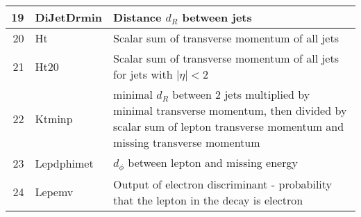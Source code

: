 \begin{table}[hb]
\begin{tabular}{|rl p{}|}
19 & \textsf{DiJetDrmin} &  Distance $d_R$ between jets \\ \hline
20 & \textsf{Ht} &  Scalar sum of transverse momentum of all jets \\ \hline
21 & \textsf{Ht20} & Scalar sum of transverse momentum of all jets for jets with $|\eta| < 2$ \\ \hline
22 & \textsf{Ktminp} &  minimal $d_R$ between 2 jets multiplied by minimal transverse momentum, then divided by scalar sum of lepton transverse momentum and missing transverse momentum \\ \hline
23 & \textsf{Lepdphimet} &  $d_\phi$ between lepton and missing energy \\ \hline
24 & \textsf{Lepemv} &  Output of electron discriminant - probability that the lepton in the decay is electron \\ \hline
\end{tabular}
\label{tab:vars}
\end{table}
